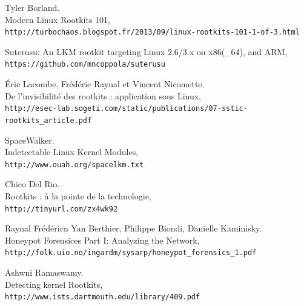 \documentclass[12pt]{article}
\begin{document}

\begin{thebibliography}{9}

Tyler Borland.\\
Modern Linux Rootkits 101,
\\\texttt{http://turbochaos.blogspot.fr/2013/09/linux-rootkits-101-1-of-3.html}

Suterusu: An LKM rootkit targeting Linux 2.6/3.x on x86(\_64), and ARM,
\\\texttt{https://github.com/mncoppola/suterusu}

Éric Lacombe, Frédéric Raynal et Vincent Nicomette.\\
De l’invisibilité des rootkits : application sous Linux,
\\\texttt{http://esec-lab.sogeti.com/static/publications/07-sstic-rootkits\_article.pdf}

SpaceWalker.\\
Indetectable Linux Kernel Modules,
\\\texttt{http://www.ouah.org/spacelkm.txt}

Chico Del Rio.\\
Rootkits : à la pointe de la technologie,
\\\texttt{http://tinyurl.com/zx4wk92}

Raynal Frédéricn Yan Berthier, Philippe Biondi, Danielle Kaminisky.\\
Honeypot Forensices Part I: Analyzing the Network,
\\\texttt{http://folk.uio.no/ingardm/sysarp/honeypot\_forensics\_1.pdf}

Ashwni Ramaswamy.\\
Detecting kernel Rootkits,
\\\texttt{http://www.ists.dartmouth.edu/library/409.pdf}




\end{thebibliography}
\end{document}
